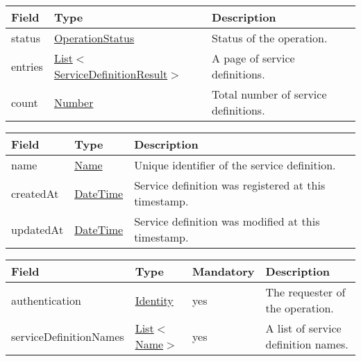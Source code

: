 \documentclass[a4paper]{arrowhead}
\newcommand{\pref}[1]{{\textcolor{ArrowheadGrey}{\hyperref[sec:model:primitives:#1]{#1}}}}
\begin{document}
\clearpage


\begin{table}[ht!]
\begin{tabularx}{\textwidth}{| p{2.5cm} | p{5cm} | X |} \hline
\rowcolor{gray!33} Field & Type      & Description \\ \hline
status & \pref{OperationStatus} & Status of the operation. \\ \hline
entries & \pref{List}$<$\hyperref[sec:model:ServiceDefinitionResult]{ServiceDefinitionResult}$>$ & A page of service definitions. \\ \hline
count & \pref{Number} & Total number of service definitions. \\ \hline
\end{tabularx}
\end{table}

 
\begin{table}[ht!]
\begin{tabularx}{\textwidth}{| p{2.5cm} | p{2.5cm} | X |} \hline
\rowcolor{gray!33} Field & Type      & Description \\ \hline
name & \pref{Name} & Unique identifier of the service definition. \\ \hline
createdAt & \pref{DateTime} & Service definition was registered at this timestamp. \\ \hline
updatedAt & \pref{DateTime} & Service definition was modified at this timestamp. \\ \hline
\end{tabularx}
\end{table}

 
\begin{table}[ht!]
\begin{tabularx}{\textwidth}{| p{3.7cm} | p{2.5cm} | p{2cm} | X |} \hline
\rowcolor{gray!33} Field & Type & Mandatory & Description \\ \hline
authentication & \hyperref[sec:model:Identity]{Identity} & yes & The requester of the operation. \\ \hline
serviceDefinitionNames & \pref{List}$<$\pref{Name}$>$ & yes & A list of service definition names. \\ \hline
\end{tabularx}
\end{table}
\end{document}
